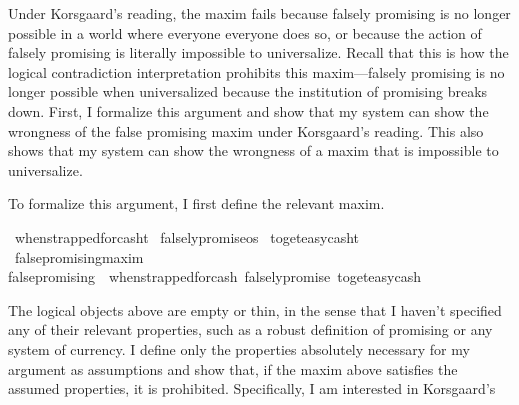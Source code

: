 \begin{isabellebody}
\begin{isamarkuptext}
Under Korsgaard's reading, the maxim fails because falsely promising is no longer possible in a world where 
everyone everyone does so, or because the action of falsely promising is literally impossible to
universalize. Recall that this is how the logical contradiction interpretation prohibits this maxim—falsely 
promising is no longer possible when universalized because the institution of promising breaks down. 
First, I formalize this argument and show that my system can show the wrongness of the false
promising maxim under Korsgaard's reading. This also shows that my system can show the wrongness of a
maxim that is impossible to universalize. 

To formalize this argument, I first define the relevant maxim.%
\end{isamarkuptext}\isamarkuptrue%
\isamarkupfalse%
\ when{\isacharunderscore}strapped{\isacharunderscore}for{\isacharunderscore}cash{\isacharcolon}{\isacharcolon}t\isanewline
%
\isanewline
{}\isamarkupfalse%
\ falsely{\isacharunderscore}promise{\isacharcolon}{\isacharcolon}os\isanewline
%
\isanewline
{}\isamarkupfalse%
\ to{\isacharunderscore}get{\isacharunderscore}easy{\isacharunderscore}cash{\isacharcolon}{\isacharcolon}t\isanewline
%
\isanewline
\isanewline
{}\isamarkupfalse%
\ false{\isacharunderscore}promising{\isacharcolon}{\isacharcolon}maxim\ \ \isanewline
{\isachardoublequoteopen}false{\isacharunderscore}promising\ {\isasymequiv}\ {\isacharparenleft}when{\isacharunderscore}strapped{\isacharunderscore}for{\isacharunderscore}cash{\isacharcomma}\ falsely{\isacharunderscore}promise{\isacharcomma}\ to{\isacharunderscore}get{\isacharunderscore}easy{\isacharunderscore}cash{\isacharparenright}{\isachardoublequoteclose}\isanewline
%
%
\begin{isamarkuptext}%
The logical objects above are empty or thin, in the sense that I haven't specified any of their 
relevant properties, such as a robust definition of promising or any system of currency. I define 
only the properties absolutely necessary for my argument as assumptions and show that, if the maxim 
above satisfies the assumed properties, it is prohibited. Specifically, I am interested in Korsgaard's

\end{isamarkuptext}
\end{isabellebody}
